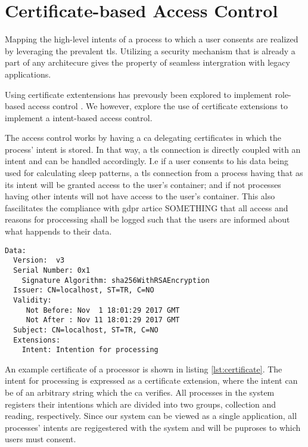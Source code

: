\documentclass[USenglish]{uit-thesis}
\begin{document}
\section{Certificate-based Access Control}
Mapping the high-level intents of a process to which a user consents are realized by
leveraging the prevalent \gls{tls}.
Utilizing a security mechanism that is already a part of any architecure gives
the property of seamless intergration with legacy applications.

Using certificate extentensions has prevously been explored to implement role-based access control \cite{7095802, 1189190}.
We however, explore the use of certificate extensions to implement a intent-based access control.

The access control works by having a \gls{ca} delegating certificates in which the process'
intent is stored.
In that way, a \gls{tls} connection is directly coupled with an intent and can be
handled accordingly.
I.e if a user consents to his data being used for calculating sleep patterns, a \gls{tls}
connection from a process having that as its intent will be granted access to the user's
container; and if not processes having other intents will not have access to the user's container.
This also fascilitates the compliance with \gls{gdpr} artice SOMETHING that all access and reasons
for proccessing shall be logged such that the users are informed about what happends to their data.

\begin{lstlisting}[frame=single, caption={Intent certificate. Some fields are left out for brievity}, label={lst:certificate}]
    Data:
  Version:  v3
  Serial Number: 0x1
    Signature Algorithm: sha256WithRSAEncryption
  Issuer: CN=localhost, ST=TR, C=NO
  Validity:
     Not Before: Nov  1 18:01:29 2017 GMT
     Not After : Nov 11 18:01:29 2017 GMT
  Subject: CN=localhost, ST=TR, C=NO
  Extensions:
    Intent: Intention for processing
\end{lstlisting}

An example certificate of a processor is shown in listing \ref{lst:certificate}.
The intent for processing is expressed as a certificate extension, where the
intent can be of an arbitrary string which the \gls{ca} verifies.
All processes in the system registers their intentions which are divided into two
groups, collection and reading, respectively.
Since our system can be viewed as a single application, all processes' intents
are regigestered with the system and will be puproses to which users must consent.
\end{document}
